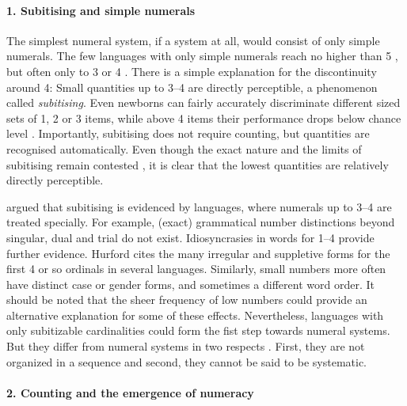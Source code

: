 \documentclass{../src/bcthesispart}
\begin{document}
\paragraph{1. Subitising and simple numerals}

The simplest numeral system, if a system at all, would consist of only simple numerals.
The few languages with only simple numerals reach no higher than 5 \parencite[256]{Greenberg1978}, but often only to 3 or 4 \parencite{VonMengden2008}.
There is a simple explanation for the discontinuity around 4: 
Small quantities up to 3--4 are directly perceptible, a phenomenon called \emph{subitising}.
Even newborns can fairly accurately discriminate different sized sets of 1, 2 or 3 items, while above 4 items their performance drops below chance level \parencite{Feigenson2004}.
Importantly, subitising does not require counting, but quantities are recognised  automatically.
Even though the exact nature and the limits of subitising remain contested \parencite{Dehaene2011,Feigenson2004}, it is clear that the lowest quantities are relatively directly perceptible.



\textcite{Hurford2001} argued that subitising is evidenced by languages, where numerals up to 3--4 are treated specially.
For example, (exact) grammatical number distinctions beyond singular, dual and trial do not exist.
Idiosyncrasies in words for 1--4 provide further evidence.
Hurford cites the many irregular and suppletive forms for the first 4 or so ordinals in several languages.
Similarly, small numbers more often have distinct case or gender forms, and sometimes a different word order.
It should be noted that the sheer frequency of low numbers  \parencite{Dehaene1992} could provide an alternative explanation for some of these effects.
Nevertheless, languages with only subitizable cardinalities could form the fist step towards numeral systems.
But they differ from numeral systems in two respects \parencite{VonMengden2008}.
First, they are not organized in a sequence and second, they cannot be said to be systematic.




\paragraph{2. Counting and the emergence of numeracy}
\end{document}
